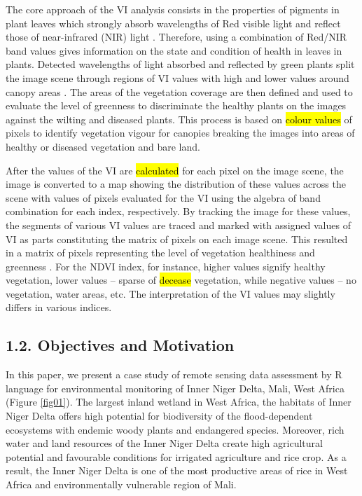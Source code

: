 \documentclass[12pt,a4paper,oneside]{article}
\def \newpar{\vspace{6pt}}
\begin{document}
\newpar The core approach of the VI analysis consists in the properties of pigments in plant leaves which strongly absorb wavelengths of Red visible light and reflect those of near-infrared (NIR) light \citep{rs9050472}. Therefore, using a combination of Red/NIR  band values gives information on the state and condition of health in leaves in plants. Detected wavelengths of light absorbed and reflected by green plants split the image scene through regions of VI values with high and lower values around canopy areas \citep{agronomy9050226,jimaging9050098}. The areas of the vegetation coverage are then defined and used to evaluate the level of greenness to discriminate the healthy plants on the images against the wilting and diseased plants. This process is based on \hl{colour values} of pixels to identify vegetation vigour for canopies breaking the images into areas of healthy or diseased vegetation and bare land. 

\newpar After the values of the VI are \hl{calculated} for each pixel on the image scene, the image is converted to a map showing the distribution of these values across the scene with values of pixels evaluated for the VI using the algebra of band combination for each index, respectively. By tracking the image for these values, the segments of various VI values are traced and marked with assigned values of VI as parts constituting the matrix of pixels on each image scene. This resulted in a matrix of pixels representing the level of vegetation healthiness and greenness \citep{agronomy9050238}. For the NDVI index, for instance, higher values signify healthy vegetation, lower values -- sparse of \hl{decease} vegetation, while negative values -- no vegetation, water areas, etc. The interpretation of the VI values may slightly differs in various indices.

\subsection*{1.2. Objectives and Motivation}

\newpar In this paper, we present a case study of remote sensing data assessment by R language for environmental monitoring of Inner Niger Delta, Mali, West Africa (Figure \ref{fig01}). The largest inland wetland in West Africa, the habitats of Inner Niger Delta offers high potential for biodiversity of the flood-dependent ecosystems with endemic woody plants and endangered species. Moreover, rich water and land resources of the Inner Niger Delta create high agricultural potential and favourable conditions for irrigated agriculture and rice crop. As a result, the Inner Niger Delta is one of the most productive areas of rice in West Africa and environmentally vulnerable region of Mali.
\end{document}

